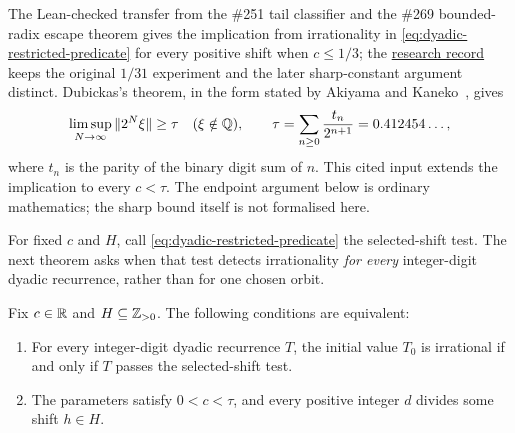 \documentclass[11pt]{article}
\begin{document}
The Lean-checked transfer from the \#251 tail classifier and the \#269
bounded-radix escape theorem gives the implication from irrationality in
\eqref{eq:dyadic-restricted-predicate} for every positive shift when
$c\le1/3$; the \href{\repobase/research/experiments/premise_exchange/README.md\#how-the-question-closed}{research record}
keeps the original $1/31$ experiment and the later sharp-constant argument
distinct. Dubickas's theorem, in the form stated by Akiyama and
Kaneko~\cite{akiyamakaneko}, gives
\[
 \limsup_{N\to\infty}\|2^N\xi\|\ge\tau
 \quad(\xi\notin\mathbb{Q}),\qquad
 \tau=\sum_{n\ge0}\frac{t_n}{2^{n+1}}=0.412454\ldots,
\]
where $t_n$ is the parity of the binary digit sum of $n$. This cited input
extends the implication to every $c<\tau$. The endpoint argument below is
ordinary mathematics; the sharp bound itself is not formalised here.

For fixed $c$ and $H$, call \eqref{eq:dyadic-restricted-predicate} the
selected-shift test. The next theorem asks when that test detects
irrationality \emph{for every} integer-digit dyadic recurrence, rather than
for one chosen orbit.

\begin{theorem}\label{thm:restricted-dyadic-shifts}
Fix $c\in\mathbb{R}$ and $H\subseteq\mathbb{Z}_{>0}$. The following conditions are
equivalent:
\begin{enumerate}
\item For every integer-digit dyadic recurrence $T$, the initial value $T_0$
is irrational if and only if $T$ passes the selected-shift test.
\item The parameters satisfy $0<c<\tau$, and every positive integer $d$
divides some shift $h\in H$.
\end{enumerate}
\end{theorem}
\end{document}
